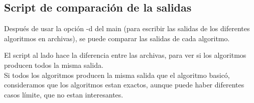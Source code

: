 \documentclass[a4paper,11pt]{article}
\begin{document}
\subsection{Script de comparación de la salidas}

Después de usar la opción -d del main (para escribir las salidas de los diferentes algoritmos en archivas), se puede comparar las salidas de cada algoritmo.

\begin{minipage}{0.35\linewidth}
El script al lado hace la diferencia entre las archivas, para ver si los algoritmos producen todos la misma salida.\\

Si todos los algoritmos producen la misma salida que el algoritmo basicó, consideramos que los algoritmos estan exactos, aunque puede haber diferentes casos límite, que no estan interesantes.
\end{minipage}\hfill
\end{document}
